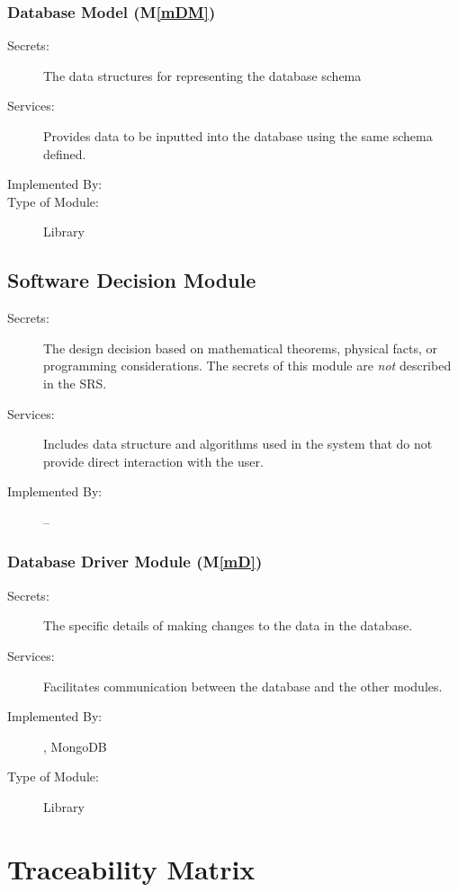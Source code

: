\documentclass[12pt, titlepage]{article}
\newcommand{\mref}[1]{M\ref{#1}}
\begin{document}
\subsubsection{Database Model (\mref{mDM})}

\begin{description}
\item[Secrets:] The data structures for representing the database schema
\item[Services:] Provides data to be inputted into the database using the same schema defined.
\item[Implemented By:] \progname{}
\item[Type of Module:] Library
\end{description}

\subsection{Software Decision Module}

\begin{description}
\item[Secrets:] The design decision based on mathematical theorems, physical
  facts, or programming considerations. The secrets of this module are
  \emph{not} described in the SRS.
\item[Services:] Includes data structure and algorithms used in the system that
  do not provide direct interaction with the user. 
\item[Implemented By:] --
\end{description}

\subsubsection{Database Driver Module (\mref{mD})}
\begin{description}
\item[Secrets:] The specific details of making changes to the data in the database.
\item[Services:] Facilitates communication between the database and the other modules.
\item[Implemented By:] \progname{}, MongoDB
\item[Type of Module:] Library
\end{description}

\section{Traceability Matrix} \label{SecTM}
\end{document}
